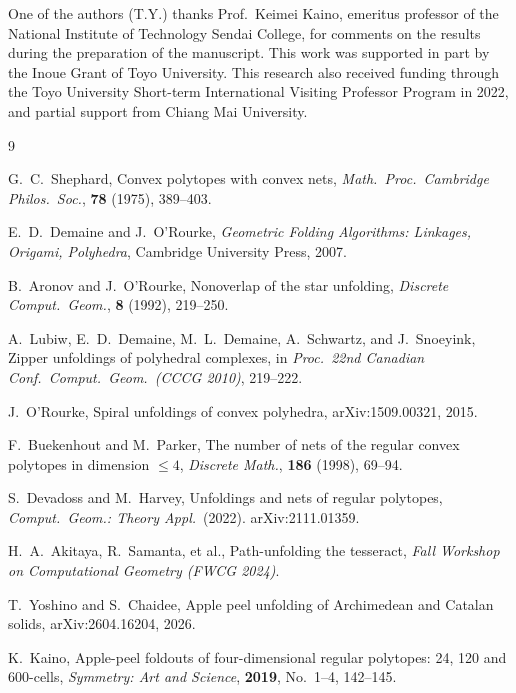 \documentclass[12pt]{article}
\theoremstyle{definition}
\begin{document}
One of the authors (T.Y.) thanks Prof.\ Keimei Kaino, emeritus professor
of the National Institute of Technology Sendai College,
for comments on the results during the preparation of the manuscript.
This work was supported in part by the Inoue Grant of Toyo University.
This research also received funding through the Toyo University
Short-term International Visiting Professor Program in 2022,
and partial support from Chiang Mai University.

\begin{thebibliography}{9}

G.~C.~Shephard,
Convex polytopes with convex nets,
\textit{Math.\ Proc.\ Cambridge Philos.\ Soc.},
\textbf{78} (1975), 389--403.

E.~D.~Demaine and J.~O'Rourke,
\textit{Geometric Folding Algorithms: Linkages, Origami, Polyhedra},
Cambridge University Press, 2007.

B.~Aronov and J.~O'Rourke,
Nonoverlap of the star unfolding,
\textit{Discrete Comput.\ Geom.},
\textbf{8} (1992), 219--250.

A.~Lubiw, E.~D.~Demaine, M.~L.~Demaine, A.~Schwartz, and J.~Snoeyink,
Zipper unfoldings of polyhedral complexes,
in \textit{Proc.\ 22nd Canadian Conf.\ Comput.\ Geom.\ (CCCG 2010)},
219--222.

J.~O'Rourke,
Spiral unfoldings of convex polyhedra,
arXiv:1509.00321, 2015.

F.~Buekenhout and M.~Parker,
The number of nets of the regular convex polytopes in dimension $\leq 4$,
\textit{Discrete Math.},
\textbf{186} (1998), 69--94.

S.~Devadoss and M.~Harvey,
Unfoldings and nets of regular polytopes,
\textit{Comput.\ Geom.: Theory Appl.}\ (2022).
arXiv:2111.01359.

H.~A.~Akitaya, R.~Samanta, et al.,
Path-unfolding the tesseract,
\textit{Fall Workshop on Computational Geometry (FWCG 2024)}.

T.~Yoshino and S.~Chaidee,
Apple peel unfolding of {A}rchimedean and {C}atalan solids,
arXiv:2604.16204, 2026.

K.~Kaino,
Apple-peel foldouts of four-dimensional regular polytopes:
24, 120 and 600-cells,
\textit{Symmetry: Art and Science},
\textbf{2019}, No.~1--4, 142--145.

\end{thebibliography}
\end{document}
